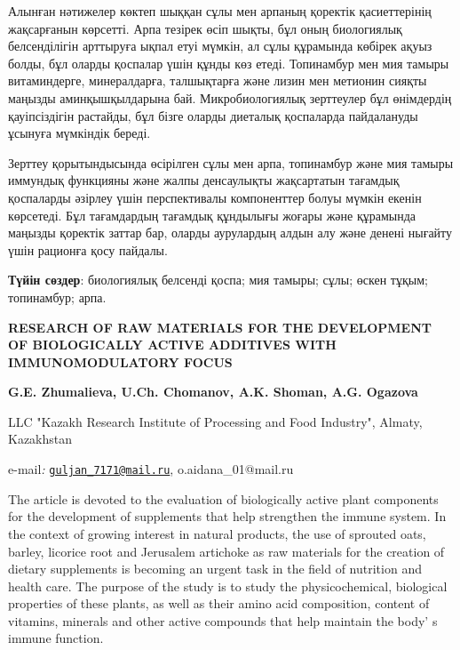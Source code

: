 Алынған нәтижелер көктеп шыққан сұлы мен арпаның қоректік қасиеттерінің
жақсарғанын көрсетті. Арпа тезірек өсіп шықты, бұл оның биологиялық
белсенділігін арттыруға ықпал етуі мүмкін, ал сұлы құрамында көбірек
ақуыз болды, бұл оларды қоспалар үшін құнды көз етеді. Топинамбур мен
мия тамыры витаминдерге, минералдарға, талшықтарға және лизин мен
метионин сияқты маңызды аминқышқылдарына бай. Микробиологиялық
зерттеулер бұл өнімдердің қауіпсіздігін растайды, бұл бізге оларды
диеталық қоспаларда пайдалануды ұсынуға мүмкіндік береді.

Зерттеу қорытындысында өсірілген сұлы мен арпа, топинамбур және мия
тамыры иммундық функцияны және жалпы денсаулықты жақсартатын тағамдық
қоспаларды әзірлеу үшін перспективалы компоненттер болуы мүмкін екенін
көрсетеді. Бұл тағамдардың тағамдық құндылығы жоғары және құрамында
маңызды қоректік заттар бар, оларды аурулардың алдын алу және денені
нығайту үшін рационға қосу пайдалы.

{\bfseries Түйін сөздер}: биологиялық белсенді қоспа; мия тамыры; сұлы;
өскен тұқым; топинамбур; арпа.

\begin{articleheader}
{\bfseries RESEARCH OF RAW MATERIALS FOR THE DEVELOPMENT OF BIOLOGICALLY
ACTIVE ADDITIVES WITH IMMUNOMODULATORY FOCUS}

{\bfseries
G.E. Zhumalieva\textsuperscript{\envelope },
U.Ch. Chomanov,
A.K. Shoman,
A.G. Ogazova\textsuperscript{\envelope }
}
\end{articleheader}

\begin{affiliation}
LLC "Kazakh Research Institute of Processing and Food Industry", Almaty,
Kazakhstan

e-mail\emph{:}
\href{mailto:guljan\_7171@mail.ru}{\nolinkurl{guljan\_7171@mail.ru}},
o.aidana\_01@mail.ru
\end{affiliation}

The article is devoted to the evaluation of biologically active plant
components for the development of supplements that help strengthen the
immune system. In the context of growing interest in natural products,
the use of sprouted oats, barley, licorice root and Jerusalem artichoke
as raw materials for the creation of dietary supplements is becoming an
urgent task in the field of nutrition and health care. The purpose of
the study is to study the physicochemical, biological properties of
these plants, as well as their amino acid composition, content of
vitamins, minerals and other active compounds that help maintain the
body' s immune function.

